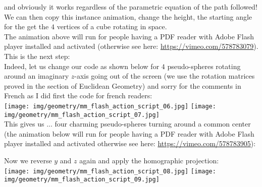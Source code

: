 	\begin{tcolorbox}[colframe=black,colback=white,sharp corners]
	and obviously it works regardless of the parametric equation of the path followed! We can then copy this instance animation, change the height, the starting angle for the get the $4$ vertices of a cube rotating in space.\\
	
	The animation above will run for people having a PDF reader with Adobe Flash player installed and activated (otherwise see here: \url{https://vimeo.com/578783079}).\\

	This is the next step:\\

	Indeed, let us change our code as shown below for $4$ pseudo-spheres rotating around an imaginary $z$-axis going out of the screen (we use the rotation matrices proved in the section of Euclidean Geometry) and sorry for the comments in French as I did first the code for french readers:\\
	
	\texttt{[image: img/geometry/mm\_flash\_action\_script\_06.jpg]}
	\texttt{[image: img/geometry/mm\_flash\_action\_script\_07.jpg]}\\
	
	This gives us ... four charming pseudo-spheres turning around a common center (the animation below will run for people having a PDF reader with Adobe Flash player installed and activated otherwise see here: \url{https://vimeo.com/578783905}):
	\end{tcolorbox}
	
	\pagebreak
	\begin{tcolorbox}[colframe=black,colback=white,sharp corners]
	\begin{center}
	\centering
	\end{center}
	Now we reverse $y$ and $z$ again and apply the homographic projection:\\
	
	\texttt{[image: img/geometry/mm\_flash\_action\_script\_08.jpg]}
	\texttt{[image: img/geometry/mm\_flash\_action\_script\_09.jpg]}
	\end{tcolorbox}
	
